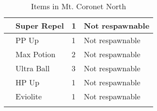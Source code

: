\begin{longtable}{|| l l l l ||}%
\hline%
&Super Repel&1&Not respawnable\\%
\hline%
&PP Up&1&Not respawnable\\%
\hline%
&Max Potion&2&Not respawnable\\%
\hline%
&Ultra Ball&3&Not respawnable\\%
\hline%
&HP Up&1&Not respawnable\\%
\hline%
&Eviolite&1&Not respawnable\\%
\hline%
\endhead%
\hline%
\caption{Items in Mt. Coronet North}%
\label{tab:Mt.CoronetNorthItems}%
\end{longtable}